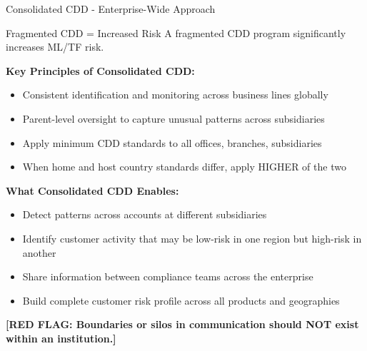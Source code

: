 \documentclass[11pt,a4paper]{beamer}
\newcommand{\redflag}[1]{\textcolor{red!80!black}{\textbf{[RED FLAG: #1]}}}
\begin{document}
	\begin{frame}{Consolidated CDD - Enterprise-Wide Approach}
		\begin{block}{Fragmented CDD = Increased Risk}
			A fragmented CDD program significantly increases ML/TF risk.
		\end{block}
		\textbf{Key Principles of Consolidated CDD:}
		\begin{itemize}
			\item Consistent identification and monitoring across business lines globally
			\item Parent-level oversight to capture unusual patterns across subsidiaries
			\item Apply minimum CDD standards to all offices, branches, subsidiaries
			\item When home and host country standards differ, apply HIGHER of the two
		\end{itemize}
		\textbf{What Consolidated CDD Enables:}
		\begin{itemize}
			\item Detect patterns across accounts at different subsidiaries
			\item Identify customer activity that may be low-risk in one region but high-risk in another
			\item Share information between compliance teams across the enterprise
			\item Build complete customer risk profile across all products and geographies
		\end{itemize}
		\redflag{Boundaries or silos in communication should NOT exist within an institution.}
	\end{frame}
	
	
\end{document}

